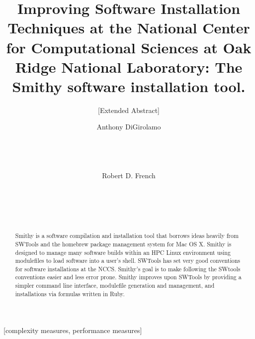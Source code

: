 \documentclass{acm_proc_article-sp}
\begin{document}
\title{Improving Software Installation Techniques at the National Center for Computational Sciences at Oak Ridge National Laboratory: The Smithy software installation tool.}

\subtitle{[Extended Abstract]
}

%
\author{
\alignauthor
Anthony DiGirolamo\\
       \\
       \\
       \\
       \\
\alignauthor
Robert D. French\\
       \\
       \\
       \\
       \\
}

\begin{abstract}
Smithy is a software compilation and installation tool that borrows ideas heavily from SWTools\cite{swtools} and the homebrew\cite{homebrew} package management system for Mac OS X.  Smithy is designed to manage many software builds within an HPC Linux environment using modulefiles to load software into a user's shell.  SWTools has set very good conventions for software installations at the NCCS.  Smithy's goal is to make following the SWtools conventions easier and less error prone.  Smithy improves upon SWTools by providing a simpler command line interface, modulefile generation and management, and installations via formulas written in Ruby.
\end{abstract}

[complexity measures, performance measures]
\end{document}
